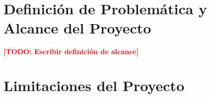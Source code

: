 \documentclass[12pt, letterpaper, oneside]{article}
\newcommand{\TODO}[1]{\textcolor{red}{\textbf{[TODO: #1]}}}
\begin{document}
\section{Definición de Problemática y Alcance del Proyecto}
\label{sec:alcance}


\TODO{Escribir definición de alcance}


\section{Limitaciones del Proyecto}
\label{sec:limitaciones}

\end{document}
